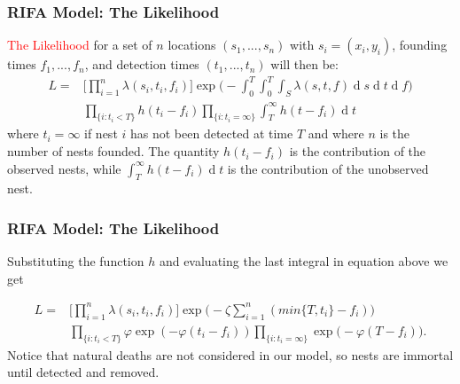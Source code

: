 \documentclass[9pt, xcolor={dvipsnames,svgnames,table}]{beamer}
\renewcommand{\d}[1]{\ensuremath{\operatorname{d}\!{#1}}}
\begin{document}
\begin{frame}
\frametitle{RIFA Model: The Likelihood}
    \textcolor{Red}{The Likelihood} for a set of $n$ locations $(s_{1}, ... , s_{n})$ with $s_i = (x_i, y_i)$, founding times $f_{1}, ... , f_{n}$, and detection times $(t_{1},  ... , t_{n})$ will then be:
    \begin{equation*} \label{eq:like}
        \begin{aligned}
            L = & \Bigg[ \prod_{i = 1}^{n} \lambda(s_{i}, t_{i}, f_{i}) \Bigg] \exp \Bigg(- \int_{0}^{T} \int_{0}^{T} \int_{S} \lambda(s, t, f) \d s \d t \d f \Bigg) \\ 
            & \prod_{\{ i : t_{i} < T \} } h(t_{i} - f_{i}) \prod_{ \{ i : t_{i} = \infty \} } \int_{T}^{\infty} h(t - f_{i}) \d t
        \end{aligned}
    \end{equation*}
    where $t_{i} = \infty$ if nest $i$ has not been detected at time $T$ and where $n$ is the number of nests founded. The quantity $h(t_{i} - f_{i})$ is the contribution of the observed nests, while $\int_{T}^{\infty} h(t - f_{i}) \d t$ is the contribution of the unobserved nest.
\end{frame}





\begin{frame}
    \frametitle{RIFA Model: The Likelihood}
    Substituting the function $h$ and evaluating the last integral in equation above we get

    \begin{equation*}
        \begin{aligned}
            L = & \Bigg[ \prod_{i = 1}^{n} \lambda(s_{i}, t_{i}, f_{i}) \Bigg] \exp \bigg(- \zeta \sum_{i=1}^{n} (min\{ T, t_i \} - f_i) \bigg) \\ 
            & \prod_{\{ i : t_{i} < T \} } \varphi \exp (- \varphi (t_{i} - f_{i})) \prod_{ \{ i : t_{i} = \infty \} } \exp \bigg( - \varphi(T - f_{i}) \bigg).
        \end{aligned}
    \end{equation*}
    \textcolor{PineGreen}{Notice that natural deaths are not considered in our model, so nests are immortal until detected and removed.}
\end{frame}
    
    
    
\end{document}
